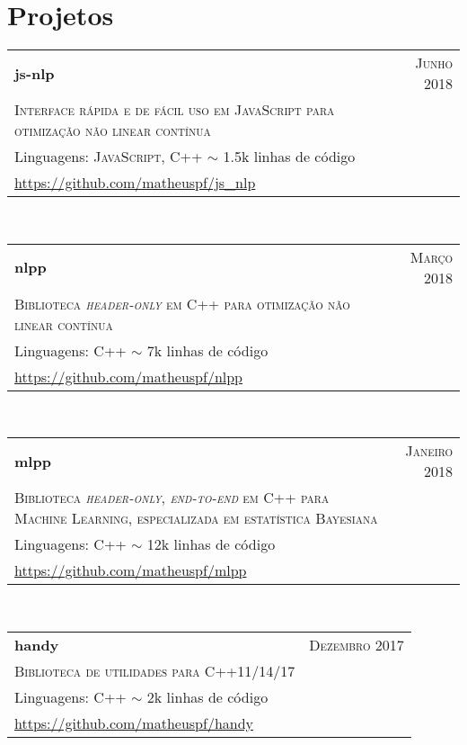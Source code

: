 \section{Projetos}

\begin{tabular}{p{11cm}|r}
  \label{js-nlp}
  \textbf{js-nlp}  & \textsc{Junho 2018} \\
  \textsc{Interface rápida e de fácil uso em JavaScript para otimização não linear contínua} & \\
  \footnotesize{Linguagens: \textsc{JavaScript, C++}} \hspace{0.5cm} $\sim$ 1.5k linhas de código & \\
  \footnotesize{\url{https://github.com/matheuspf/js_nlp}} & \\
\end{tabular}\\

\begin{tabular}{p{11cm}|r}
  \label{nlpp}
  \textbf{nlpp}  & \textsc{Março 2018} \\
  \textsc{Biblioteca \textit{header-only} em C++ para otimização não linear contínua} & \\
  \footnotesize{Linguagens: \textsc{C++}} \hspace{0.5cm} $\sim$ 7k linhas de código & \\
  \footnotesize{\url{https://github.com/matheuspf/nlpp}} & \\
\end{tabular}\\

\begin{tabular}{p{11cm}|r}
  \label{mlpp}
  \textbf{mlpp}  & \textsc{Janeiro 2018} \\
  \textsc{Biblioteca \textit{header-only}, \textit{end-to-end} em C++ para Machine Learning, especializada em estatística Bayesiana} & \\
  \footnotesize{Linguagens: \textsc{C++}} \hspace{0.5cm} $\sim$ 12k linhas de código & \\
  \footnotesize{\url{https://github.com/matheuspf/mlpp}} & \\
\end{tabular}\\

\begin{tabular}{p{11cm}|r}
  \textbf{handy}  & \textsc{Dezembro 2017} \\
  \textsc{Biblioteca de utilidades para C++11/14/17} & \\
  \footnotesize{Linguagens: \textsc{C++}} \hspace{0.5cm} $\sim$ 2k linhas de código & \\
  \footnotesize{\url{https://github.com/matheuspf/handy}} & \\
\end{tabular}\\

